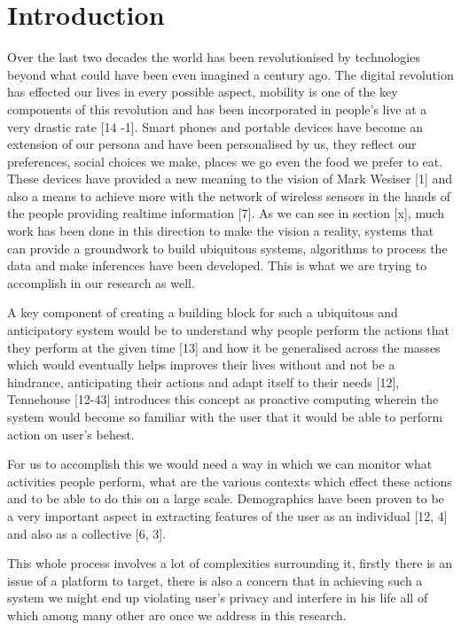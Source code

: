 \documentclass[12pt]{report}
\begin{document}
\chapter{Introduction}
\noindent
Over the last two decades the world has been revolutionised by technologies beyond what could have been even imagined a century ago. The digital revolution has effected our lives in every possible aspect, mobility is one of the key components of this revolution and has been incorporated in people's live at a very drastic rate [14 -1]. Smart phones and portable devices have become an extension of our persona and have been personalised by us, they reflect our preferences, social choices we make, places we go even the food we prefer to eat. These devices have provided a new meaning to the vision of Mark Wesiser [1] and also a means to achieve more with the network of wireless sensors in the hands of the people providing realtime information [7]. As we can see in section [x], much work has been done in this direction to make the vision a reality, systems that can provide a groundwork to build ubiquitous systems, algorithms to process the data and make inferences have been developed. This is what we are trying to accomplish in our research as well.

A key component of creating a building block for such a ubiquitous and anticipatory system would be to understand why people perform the actions that they perform at the given time [13] and how it be generalised across the masses which would eventually helps improves their lives without and not be a hindrance, anticipating their actions and adapt itself to their needs [12], Tennehouse [12-43] introduces this concept as proactive computing wherein the system would become so familiar with the user that it would be able to perform action on user's behest.

For us to accomplish this we would need a way in which we can monitor what activities people perform, what are the various contexts which effect these actions and to be able to do this on a large scale. Demographics have been proven to be a very important aspect in extracting features of the user as an individual [12, 4] and also as a collective [6, 3].

This whole process involves a lot of complexities surrounding it, firstly there is an issue of a platform to target, there is also a concern that in achieving such a system we might end up violating user's privacy and interfere in his life all of which among many other are once we address in this research.
\end{document}
